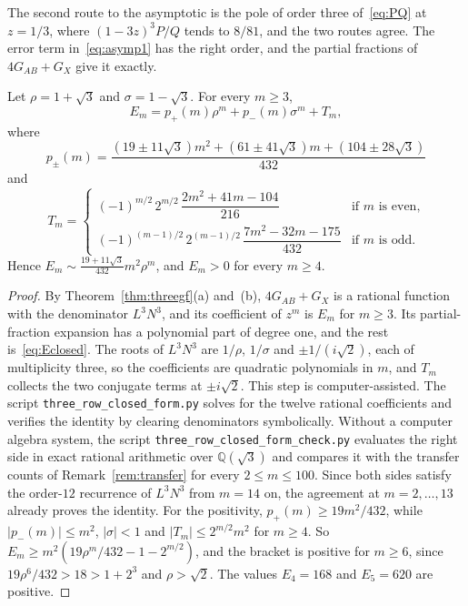 The second route to the asymptotic is the pole of order three of~\eqref{eq:PQ} at $z=1/3$,
where $(1-3z)^3P/Q$ tends to $8/81$, and the two routes agree. The error term
in~\eqref{eq:asymp1} has the right order, and the partial fractions of $4G_{AB}+G_X$ give it
exactly.

\begin{theorem}\label{thm:threeclosed}
Let $\rho=1+\sqrt3$ and $\sigma=1-\sqrt3$. For every $m\ge3$,
\begin{equation}\label{eq:Eclosed}
E_m=p_+(m)\rho^m+p_-(m)\sigma^m+T_m,
\end{equation}
where
\[
p_\pm(m)=\frac{(19\pm11\sqrt3)m^2+(61\pm41\sqrt3)m+(104\pm28\sqrt3)}{432}
\]
and
\[
T_m=\begin{cases}
(-1)^{m/2}\,2^{m/2}\,\dfrac{2m^2+41m-104}{216}&\text{if $m$ is even,}\\[2ex]
(-1)^{(m-1)/2}\,2^{(m-1)/2}\,\dfrac{7m^2-32m-175}{432}&\text{if $m$ is odd.}
\end{cases}
\]
Hence $E_m\sim\frac{19+11\sqrt3}{432}m^2\rho^m$, and $E_m>0$ for every $m\ge4$.
\end{theorem}

\begin{proof}
By Theorem~\ref{thm:threegf}(a) and~(b), $4G_{AB}+G_X$ is a rational function with the
denominator $L^3N^3$, and its coefficient of $z^m$ is $E_m$ for $m\ge3$. Its partial-fraction
expansion has a polynomial part of degree one, and the rest is~\eqref{eq:Eclosed}. The roots
of $L^3N^3$ are $1/\rho$, $1/\sigma$ and $\pm1/(i\sqrt2)$, each of multiplicity three, so the
coefficients are quadratic polynomials in $m$, and $T_m$ collects the two conjugate terms at
$\pm i\sqrt2$. This step is computer-assisted. The script
\texttt{three\_row\_closed\_form.py} solves for the twelve rational coefficients and verifies
the identity by clearing denominators symbolically. Without a computer algebra system, the
script \texttt{three\_row\_closed\_form\_check.py} evaluates the right side in exact rational
arithmetic over $\mathbb Q(\sqrt3)$ and compares it with the transfer counts of
Remark~\ref{rem:transfer} for every $2\le m\le100$. Since both sides satisfy the order-$12$
recurrence of $L^3N^3$ from $m=14$ on, the agreement at $m=2,\dots,13$ already proves the
identity. For the positivity, $p_+(m)\ge19m^2/432$, while $|p_-(m)|\le m^2$, $|\sigma|<1$ and
$|T_m|\le2^{m/2}m^2$ for $m\ge4$. So $E_m\ge m^2(19\rho^m/432-1-2^{m/2})$, and the bracket is
positive for $m\ge6$, since $19\rho^6/432>18>1+2^3$ and $\rho>\sqrt2$. The values $E_4=168$
and $E_5=620$ are positive.
\end{proof}

